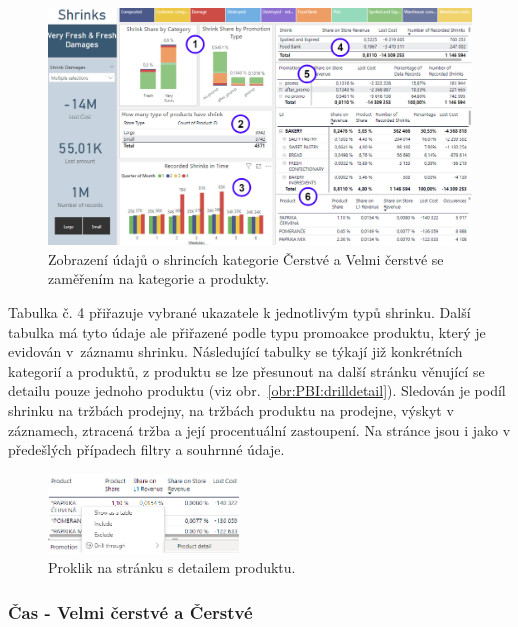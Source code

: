 \begin{figure}[h!]
    \centering
    \captionsetup{justification=centering}
    \includegraphics[width=\textwidth]{obrazky/PBI/levelsSFF.png}
    \caption{Zobrazení údajů o shrincích kategorie Čerstvé a Velmi čerstvé se zaměřením na kategorie a produkty.}
    \label{obr:PBI:storesSFF}
\end{figure}

Tabulka č. 4 přiřazuje vybrané ukazatele k jednotlivým typů shrinku. Další tabulka má tyto údaje ale přiřazené podle typu promoakce produktu, který je evidován v~záznamu shrinku. Následující tabulky se týkají již konkrétních kategorií a produktů, z produktu se lze přesunout na další stránku věnující se detailu pouze jednoho produktu (viz obr.~\ref*{obr:PBI:drilldetail}). Sledován je podíl shrinku na tržbách prodejny, na tržbách produktu na prodejne, výskyt v záznamech, ztracená tržba a její procentuální zastoupení. Na stránce jsou i jako v předešlých případech filtry a souhrnné údaje.

\begin{figure}[h!]
    \centering
    \captionsetup{justification=centering}
    \includegraphics[width=0.45\textwidth]{obrazky/PBI/detaildrill.png}
    \caption{Proklik na stránku s detailem produktu.}
    \label{obr:PBI:storesSFF}
\end{figure}

\subsubsection*{Čas - Velmi čerstvé a Čerstvé}

